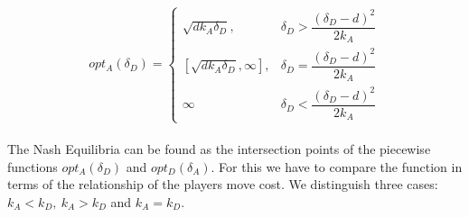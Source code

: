  \begin{displaymath}
  opt_{A}(\delta_{D}) = \left\{
     \begin{array}{lr}
       \sqrt{d k_{A}\delta_{D}}, & \delta_{D} > \dfrac{(\delta_{D}-d)^{2}}{2k_{A}}\\
       \left[ \sqrt{d k_{A}\delta_{D}}, \infty\right],  & \delta_{D} = \dfrac{(\delta_{D}-d)^{2}}{2k_{A}} \\
       \infty & \delta_{D} < \dfrac{(\delta_{D}-d)^{2}}{2k_{A}}
     \end{array}
   \right.
\end{displaymath}
\\

The Nash Equilibria can be found as the intersection points of the piecewise functions $opt_{A}(\delta_{D})$ and $opt_{D}(\delta_{A})$. For this we have to compare the function in terms of the relationship of the players move cost. We distinguish three cases: $k_{A} < k_{D} , ~k_{A} > k_{D} $ and $k_{A} = k_{D}$. 
